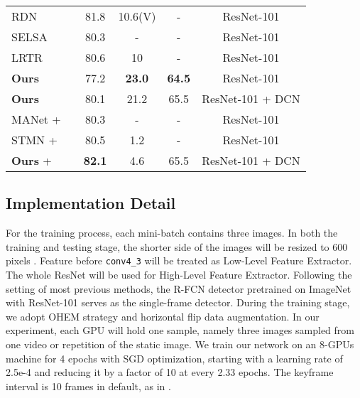 \documentclass[runningheads]{llncs}
\newcommand{\cmark}{\ding{51}}\newcommand{\xmark}{\ding{55}}
\begin{document}
\begin{table}[t]
\begin{tabular}{lccccc}
RDN  \cite{deng2019relation}              &     \xmark   & 81.8      &  10.6(V)                &-     & ResNet-101          \\
SELSA \cite{wu2019sequence}           &     \xmark   & 80.3      & -                &-      & ResNet-101            \\
LRTR \cite{shvets2019leveraging}             &     \xmark   & 80.6      & 10                &-    & ResNet-101            \\
\textbf{Ours}                                                        &   \cmark    & 77.2    & \textbf{23.0}             & \textbf{64.5}& ResNet-101   \\
\textbf{Ours}                                                     &   \cmark    & 80.1    & 21.2               & 65.5  & ResNet-101 + DCN  \\
\bottomrule[0.8pt]
MANet\cite{wang2018fully} + \cite{han2016seq}               &     \xmark     & 80.3             & -                  &-       & ResNet-101          \\
STMN \cite{xiao2018video} + \cite{han2016seq}            &     \xmark   & 80.5             & 1.2                &-       & ResNet-101            \\
\textbf{Ours} +\cite{han2016seq}                     &   \cmark   & \textbf{82.1}    & 4.6               & 65.5    & ResNet-101 + DCN    \\
\bottomrule
\end{tabular}
\label{table:video object detection results}
\end{table}

\subsection{Implementation Detail}
For the training process, each mini-batch contains three images. In both the training and testing stage, the shorter side of the images will be resized to 600 pixels \cite{ren2015faster}.  Feature before \texttt{conv4\_3} will be treated as Low-Level Feature Extractor. The whole ResNet will be used for High-Level Feature Extractor. Following the setting of most previous methods, the R-FCN detector \cite{dai2016r} pretrained on ImageNet \cite{deng2009imagenet} with ResNet-101 \cite{he2016deep} serves as the single-frame detector. During the training stage, we adopt OHEM strategy \cite{shrivastava2016training} and horizontal flip data augmentation. In our experiment, each GPU will hold one sample, namely three images sampled from one video or repetition of the static image. We train our network on an 8-GPUs machine for 4 epochs with SGD optimization, starting with a learning rate of 2.5e-4 and reducing it by a factor of 10 at every 2.33 epochs. The keyframe interval is 10 frames in default, as in \cite{zhu2017deep,zhu2017flow}.
\end{document}

